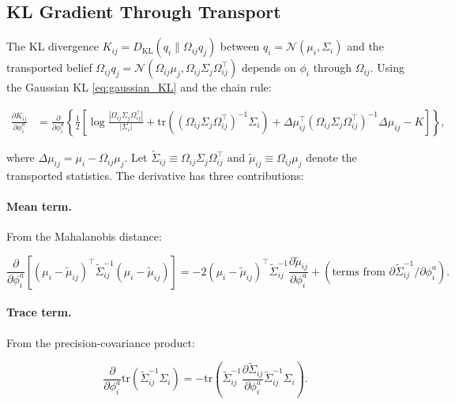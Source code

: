 \documentclass[twoside,11pt]{article}
\begin{document}
\subsection{KL Gradient Through Transport}

The KL divergence $K_{ij} = D_{\mathrm{KL}}(q_i \| \Omega_{ij} q_j)$ between $q_i = \mathcal{N}(\mu_i, \Sigma_i)$ and the transported belief $\Omega_{ij} q_j = \mathcal{N}(\Omega_{ij}\mu_j, \Omega_{ij}\Sigma_j\Omega_{ij}^\top)$ depends on $\phi_i$ through $\Omega_{ij}$. Using the Gaussian KL \eqref{eq:gaussian_KL} and the chain rule:

\begin{align}
\frac{\partial K_{ij}}{\partial \phi_i^a}
&= \frac{\partial}{\partial \phi_i^a}\left\{
\frac{1}{2}\left[
\log\frac{|\Omega_{ij}\Sigma_j\Omega_{ij}^\top|}{|\Sigma_i|}
+ \mathrm{tr} \left((\Omega_{ij}\Sigma_j\Omega_{ij}^\top)^{-1}\Sigma_i\right)
+ \Delta\mu_{ij}^\top (\Omega_{ij}\Sigma_j\Omega_{ij}^\top)^{-1} \Delta\mu_{ij}
- K
\right]\right\},
\label{eq:dKL_dphi_expanded}
\end{align}

where $\Delta\mu_{ij} = \mu_i - \Omega_{ij}\mu_j$. Let $\tilde{\Sigma}_{ij} \equiv \Omega_{ij}\Sigma_j\Omega_{ij}^\top$ and $\tilde{\mu}_{ij} \equiv \Omega_{ij}\mu_j$ denote the transported statistics. The derivative has three contributions:

\paragraph{Mean term.} From the Mahalanobis distance:

\begin{equation}
\frac{\partial}{\partial \phi_i^a}\left[(\mu_i - \tilde{\mu}_{ij})^\top \tilde{\Sigma}_{ij}^{-1}(\mu_i - \tilde{\mu}_{ij})\right]
= -2(\mu_i - \tilde{\mu}_{ij})^\top \tilde{\Sigma}_{ij}^{-1} \frac{\partial \tilde{\mu}_{ij}}{\partial \phi_i^a}
+ (\text{terms from } \partial\tilde{\Sigma}_{ij}^{-1}/\partial\phi_i^a).
\label{eq:mean_term_phi}
\end{equation}

\paragraph{Trace term.} From the precision-covariance product:

\begin{equation}
\frac{\partial}{\partial \phi_i^a}\mathrm{tr}(\tilde{\Sigma}_{ij}^{-1}\Sigma_i)
= -\mathrm{tr} \left(\tilde{\Sigma}_{ij}^{-1} \frac{\partial \tilde{\Sigma}_{ij}}{\partial \phi_i^a} \tilde{\Sigma}_{ij}^{-1} \Sigma_i\right).
\label{eq:trace_term_phi}
\end{equation}
\end{document}
